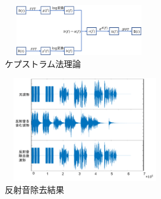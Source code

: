\documentclass[twocolumn,10pt,a4j]{jsarticle}
\begin{document}
\begin{figure}[h]
\begin{center}
 \includegraphics[clip,width=65mm,height=22mm]{flokougai.pdf}
\end{center}
 \caption{ケプストラム法理論}
 \label{fig:教科書}
\end{figure}

\begin{figure}[h]
\begin{center}
 \includegraphics[clip,width=70mm,height=45mm]{kekkahakei.pdf}
\end{center}
 \caption{反射音除去結果}
 \label{fig:教科書}
\end{figure}




\end{document}
